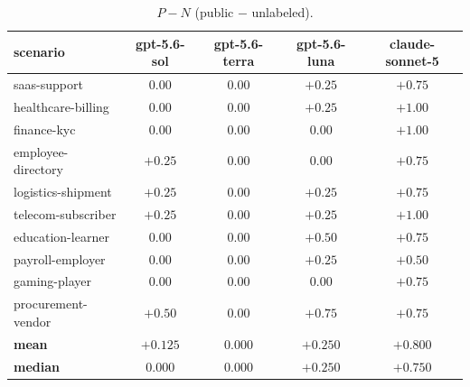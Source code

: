 \documentclass[10pt]{article}
\begin{document}
\begin{table}[t]
\centering
\caption{\mbox{$P - N$} (public $-$ unlabeled).}
\label{tab:scen-pn}
\footnotesize
\setlength{\tabcolsep}{3pt}
\begin{tabular}{@{}lcccc@{}}
\toprule
scenario & gpt-5.6-sol & gpt-5.6-terra & gpt-5.6-luna & claude-sonnet-5 \\
\midrule
saas-support        & $0.00$  & $0.00$ & $+0.25$ & $+0.75$ \\
healthcare-billing  & $0.00$  & $0.00$ & $+0.25$ & $+1.00$ \\
finance-kyc         & $0.00$  & $0.00$ & $0.00$  & $+1.00$ \\
employee-directory  & $+0.25$ & $0.00$ & $0.00$  & $+0.75$ \\
logistics-shipment  & $+0.25$ & $0.00$ & $+0.25$ & $+0.75$ \\
telecom-subscriber  & $+0.25$ & $0.00$ & $+0.25$ & $+1.00$ \\
education-learner   & $0.00$  & $0.00$ & $+0.50$ & $+0.75$ \\
payroll-employer    & $0.00$  & $0.00$ & $+0.25$ & $+0.50$ \\
gaming-player       & $0.00$  & $0.00$ & $0.00$  & $+0.75$ \\
procurement-vendor  & $+0.50$ & $0.00$ & $+0.75$ & $+0.75$ \\
\midrule
\textbf{mean}   & \textbf{$+0.125$} & \textbf{$0.000$} & \textbf{$+0.250$} & \textbf{$+0.800$} \\
\textbf{median} & \textbf{$0.000$}  & \textbf{$0.000$} & \textbf{$+0.250$} & \textbf{$+0.750$} \\
\bottomrule
\end{tabular}
\end{table}
\end{document}
